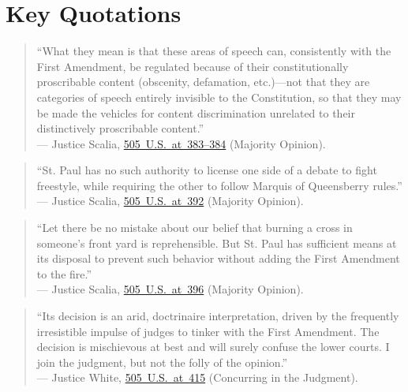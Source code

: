 \documentclass[12pt]{article}
\begin{document}
\section{Key Quotations}
\begin{quote}
``What they mean is that these areas of speech can, consistently with the First Amendment, be regulated because of their constitutionally proscribable content (obscenity, defamation, etc.)---not that they are categories of speech entirely invisible to the Constitution, so that they may be made the vehicles for content discrimination unrelated to their distinctively proscribable content.'' \\
--- Justice Scalia, \href{https://supreme.justia.com/cases/federal/us/505/377/}{505~U.S.~at~383--384} (Majority Opinion).
\end{quote}

\begin{quote}
``St. Paul has no such authority to license one side of a debate to fight freestyle, while requiring the other to follow Marquis of Queensberry rules.'' \\
--- Justice Scalia, \href{https://supreme.justia.com/cases/federal/us/505/377/}{505~U.S.~at~392} (Majority Opinion).
\end{quote}

\begin{quote}
``Let there be no mistake about our belief that burning a cross in someone's front yard is reprehensible. But St. Paul has sufficient means at its disposal to prevent such behavior without adding the First Amendment to the fire.'' \\
--- Justice Scalia, \href{https://supreme.justia.com/cases/federal/us/505/377/}{505~U.S.~at~396} (Majority Opinion).
\end{quote}

\begin{quote}
``Its decision is an arid, doctrinaire interpretation, driven by the frequently irresistible impulse of judges to tinker with the First Amendment. The decision is mischievous at best and will surely confuse the lower courts. I join the judgment, but not the folly of the opinion.'' \\
--- Justice White, \href{https://supreme.justia.com/cases/federal/us/505/377/}{505~U.S.~at~415} (Concurring in the Judgment).
\end{quote}
\end{document}
